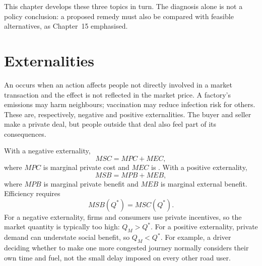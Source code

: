This chapter develops these three topics in turn. The diagnosis alone is not a
policy conclusion: a proposed remedy must also be compared with feasible
alternatives, as Chapter~15 emphasised.

\section{Externalities}

An  occurs when an action affects people not directly
involved in a market transaction and the effect is not reflected in the market
price. A factory's emissions may harm neighbours; vaccination may reduce
infection risk for others. These are, respectively, negative and positive
externalities. The buyer and seller make a private deal, but people outside
that deal also feel part of its consequences.

With a negative externality,
\[
MSC=MPC+MEC,
\]
where $MPC$ is marginal private cost and $MEC$ is . With a positive externality,
\[
MSB=MPB+MEB,
\]
where $MPB$ is marginal private benefit and $MEB$ is marginal external benefit.
Efficiency requires
\[
MSB(Q^*)=MSC(Q^*).
\]
For a negative externality, firms and consumers use private incentives, so the
market quantity is typically too high: $Q_M>Q^*$. For a positive externality,
private demand can understate social benefit, so $Q_M<Q^*$. For example, a
driver deciding whether to make one more congested journey normally considers
their own time and fuel, not the small delay imposed on every other road user.


